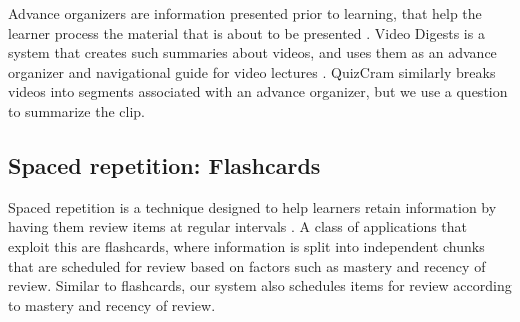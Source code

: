 \documentclass{chi-ext}
\begin{document}
Advance organizers are information presented prior to learning, that help the learner process the material that is about to be presented  \cite{advanceorganizers}. Video Digests is a system that creates such summaries about videos, and uses them as an advance organizer and navigational guide for video lectures \cite{videodigests}. QuizCram similarly breaks videos into segments associated with an advance organizer, but we use a question to summarize the clip.


\subsection{Spaced repetition: Flashcards}


Spaced repetition is a technique designed to help learners retain information by having them review  items at regular intervals \cite{karpicke2011spaced}. A class of applications that exploit this are flashcards, where information is split into independent chunks that are scheduled for review based on factors such as mastery and recency of review. Similar to flashcards, our system also schedules items for review according to mastery and recency of review.

\end{document}
